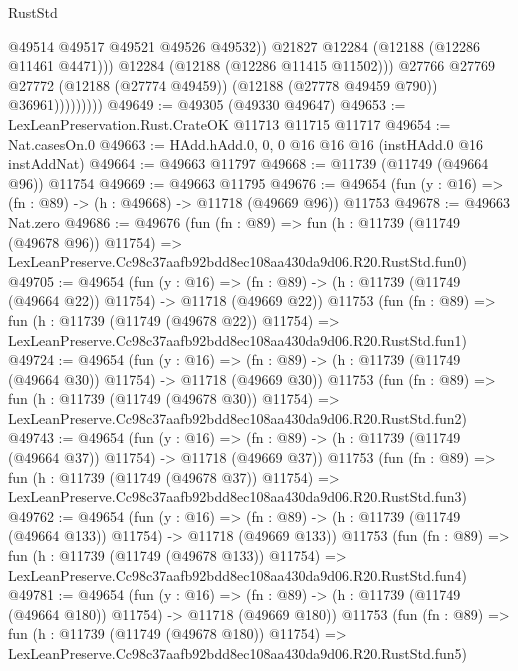 \begin{lexlean}{RustStd}
\begin{coremodule}
                              @49514
                              @49517
                              @49521
                              @49526
                              @49532))
                          @21827
                          @12284
                          (@12188 (@12286 @11461 @4471)))
                        @12284
                        (@12188 (@12286 @11415 @11502)))
                      @27766
                      @27769
                      @27772
                      (@12188 (@27774 @49459))
                      (@12188 (@27778 @49459 @790))
                      @36961)))))))))
@49649 := @49305 (@49330 @49647)
@49653 := LexLeanPreservation.Rust.CrateOK @11713 @11715 @11717
@49654 := Nat.casesOn.{0}
@49663 := HAdd.hAdd.{0, 0, 0} @16 @16 @16 (instHAdd.{0} @16 instAddNat)
@49664 := @49663 @11797
@49668 := @11739 (@11749 (@49664 @96)) @11754
@49669 := @49663 @11795
@49676 := @49654 (fun (y : @16) => (fn : @89) -> (h : @49668) -> @11718 (@49669 @96)) @11753
@49678 := @49663 Nat.zero
@49686 := @49676
    (fun (fn : @89) =>
    fun (h : @11739 (@11749 (@49678 @96)) @11754) =>
    LexLeanPreserve.Cc98c37aafb92bdd8ec108aa430da9d06.R20.RustStd.fun0)
@49705 := @49654
    (fun (y : @16) =>
    (fn : @89) -> (h : @11739 (@11749 (@49664 @22)) @11754) -> @11718 (@49669 @22))
    @11753
    (fun (fn : @89) =>
    fun (h : @11739 (@11749 (@49678 @22)) @11754) =>
    LexLeanPreserve.Cc98c37aafb92bdd8ec108aa430da9d06.R20.RustStd.fun1)
@49724 := @49654
    (fun (y : @16) =>
    (fn : @89) -> (h : @11739 (@11749 (@49664 @30)) @11754) -> @11718 (@49669 @30))
    @11753
    (fun (fn : @89) =>
    fun (h : @11739 (@11749 (@49678 @30)) @11754) =>
    LexLeanPreserve.Cc98c37aafb92bdd8ec108aa430da9d06.R20.RustStd.fun2)
@49743 := @49654
    (fun (y : @16) =>
    (fn : @89) -> (h : @11739 (@11749 (@49664 @37)) @11754) -> @11718 (@49669 @37))
    @11753
    (fun (fn : @89) =>
    fun (h : @11739 (@11749 (@49678 @37)) @11754) =>
    LexLeanPreserve.Cc98c37aafb92bdd8ec108aa430da9d06.R20.RustStd.fun3)
@49762 := @49654
    (fun (y : @16) =>
    (fn : @89) -> (h : @11739 (@11749 (@49664 @133)) @11754) -> @11718 (@49669 @133))
    @11753
    (fun (fn : @89) =>
    fun (h : @11739 (@11749 (@49678 @133)) @11754) =>
    LexLeanPreserve.Cc98c37aafb92bdd8ec108aa430da9d06.R20.RustStd.fun4)
@49781 := @49654
    (fun (y : @16) =>
    (fn : @89) -> (h : @11739 (@11749 (@49664 @180)) @11754) -> @11718 (@49669 @180))
    @11753
    (fun (fn : @89) =>
    fun (h : @11739 (@11749 (@49678 @180)) @11754) =>
    LexLeanPreserve.Cc98c37aafb92bdd8ec108aa430da9d06.R20.RustStd.fun5)

\end{coremodule}
\end{lexlean}
